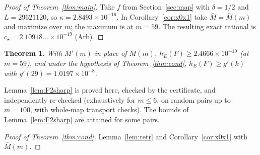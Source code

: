 \documentclass[11pt]{article}
\newtheorem{theorem}{Theorem}[section]
\theoremstyle{definition}
\theoremstyle{remark}
\newcommand{\hE}{h_E}
\begin{document}
\begin{proof}[Proof of Theorem~\ref{thm:main}]
Take $f$ from Section~\ref{sec:map} with $\delta=1/2$ and $L=29621120$, so $\kappa=2.8493\times10^{-16}$.
In Corollary~\ref{cor:x0x1} take $\bar M=\bar M(m)$ and maximize over $m$; the maximum is at
$m=59$. The resulting exact rational is $c_\star=2.10918\ldots\times10^{-19}$ (Arb).
\end{proof}

\begin{theorem}\label{thm:sharp}
With $\bar M'(m)$ in place of $\bar M(m)$, $\hE(F)\ge2.4666\times10^{-19}$ (at $m=59$), and under the
hypothesis of Theorem~\ref{thm:cond}, $\hE(F)\ge g'(k)$ with $g'(29)=1.0197\times10^{-8}$.
\end{theorem}
\noindent
Lemma~\ref{lem:F2sharp} is proved here, checked by the certificate, and independently re-checked
(exhaustively for $m\le6$, on random pairs up to $m=100$, with whole-map transport checks).
The bounds of Lemma~\ref{lem:F2sharp} are attained for some pairs.

\begin{proof}[Proof of Theorem~\ref{thm:cond}]
Lemma~\ref{lem:retr} and Corollary~\ref{cor:x0x1} with $\bar M(m)$.
\end{proof}
\end{document}
